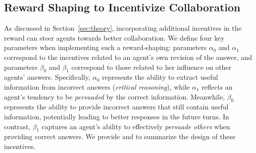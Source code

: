 {\safevspace{-2mm}

\subsection{Reward {Shaping to Incentivize Collaboration}}
\label{sec:incentive-coll}
As discussed in Section~\ref{sec:theory}, incorporating {additional incentives in the reward}  can steer  agents towards better   collaboration. We define four key parameters when implementing such a reward-shaping: parameters $\alpha_0$ and $\alpha_1$ correspond to the incentives related to an agent's own revision of the answer, {and parameters $\beta_0$ and $\beta_1$ correspond to those related to her influence on other agents' answers.} Specifically, $\alpha_0$ represents the ability to extract useful information from incorrect answers ({\it critical reasoning}), while $\alpha_1$ reflects an agent's tendency to be {\it persuaded} by the correct information. Meanwhile, $\beta_0$ represents the ability to provide incorrect answers that still contain useful information, potentially leading to better responses in the future turns. In contrast, $\beta_1$ captures an agent's ability to effectively {\it persuade others} when providing correct answers. We provide  and  to summarize the design of these incentives. 

\begin{table}[h]
    \small
    \centering
    \vspace{-2mm}

     \caption{{The design of additional incentives} regarding an agent's own answer revision in \ourstwo. The incentive is determined by how an agent changes its answer between consecutive turns ($t$ and $t+1$) relative to the majority opinion of others. \textbf{R} indicates a correct answer, \textbf{W} indicates an incorrect answer. The incentive value is applied to the agent's answer at turn $t+1$.}
    \label{tab:bonus_penalty_case1}
        \vspace{-3mm}
\end{table}

}
